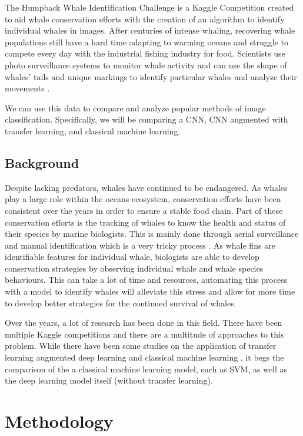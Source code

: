 \documentclass[paper=a4, fontsize=11pt]{scrartcl}
\numberwithin{equation}{section}		%
\numberwithin{table}{section}				%
\begin{document}
The Humpback Whale Identification Challenge is a Kaggle Competition created to aid whale conservation efforts with the creation of an algorithm to identify individual whales in images. After centuries of intense whaling, recovering whale populations still have a hard time adapting to warming oceans and struggle to compete every day with the industrial fishing industry for food. Scientists use photo surveillance systems to monitor whale activity and can use the shape of whales’ tails and unique markings to identify particular whales and analyze their movements \cite{JaisakthiS.M.2017Awms}.

We can use this data to compare and analyze popular methods of image classification. Specifically, we will be comparing a CNN, CNN augmented with transfer learning, and classical machine learning.

\subsection{Background}\label{sec: background}
Despite lacking predators, whales have continued to be endangered. As whales play a large role within the oceans ecosystem, conservation efforts have been consistent over the years in order to ensure a stable food chain. Part of these conservation efforts is the tracking of whales to know the health and status of their species by marine biologists. This is mainly done through aerial surveillance and manual identification which is a very tricky process \cite{JaisakthiS.M.2017Awms}. As whale fins are identifiable features for individual whale, biologists are able to develop conservation strategies by observing individual whale and whale species behaviours. This can take a lot of time and resources, automating this process with a model to identify whales will alleviate this stress and allow for more time to develop better strategies for the continued survival of whales.

Over the years, a lot of research has been done in this field. There have been multiple Kaggle competitions and there are a multitude of approaches to this problem. While there have been some studies on the application of transfer learning augmented deep learning and classical machine learning \cite{YuanHongchun2020AAIC}, it begs the comparison of the a classical machine learning model, such as SVM, as well as the deep learning model itself (without transfer learning). 

\section{Methodology}\label{sec: meth}
\end{document}
